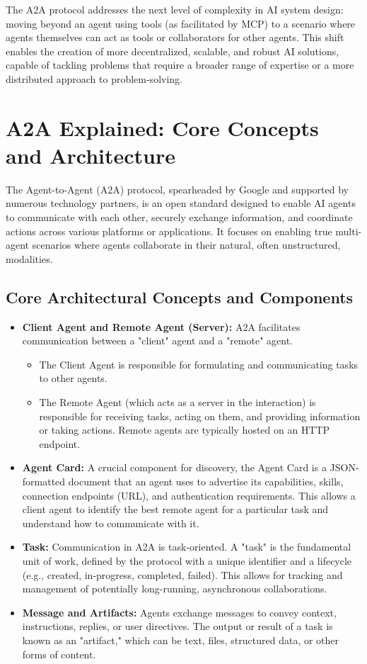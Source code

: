 The A2A protocol addresses the next level of complexity in AI system design: moving beyond an agent using tools (as facilitated by MCP) 
to a scenario where agents themselves can act as tools or collaborators for other agents. This shift enables the creation of more 
decentralized, scalable, and robust AI solutions, capable of tackling problems that require a broader range of expertise or 
a more distributed approach to problem-solving.

\section{A2A Explained: Core Concepts and Architecture}

The Agent-to-Agent (A2A) protocol, spearheaded by Google and supported by numerous technology partners, is an open standard designed 
to enable AI agents to communicate with each other, securely exchange information, and coordinate actions across various platforms or applications. 
It focuses on enabling true multi-agent scenarios where agents collaborate in their natural, often unstructured, modalities.

\subsection*{Core Architectural Concepts and Components}

\begin{itemize}
    \item \textbf{Client Agent and Remote Agent (Server):} A2A facilitates communication between a "client" agent and a "remote" agent.
    \begin{itemize}
        \item The Client Agent is responsible for formulating and communicating tasks to other agents.
        \item The Remote Agent (which acts as a server in the interaction) is responsible for receiving tasks, acting on them, and 
        providing information or taking actions. Remote agents are typically hosted on an HTTP endpoint.
    \end{itemize}
    \item \textbf{Agent Card:} A crucial component for discovery, the Agent Card is a JSON-formatted document that an agent uses to 
    advertise its capabilities, skills, connection endpoints (URL), and authentication requirements. This allows a client agent to 
    identify the best remote agent for a particular task and understand how to communicate with it.
    \item \textbf{Task:} Communication in A2A is task-oriented. A "task" is the fundamental unit of work, defined by the protocol 
    with a unique identifier and a lifecycle (e.g., created, in-progress, completed, failed). This allows for tracking and management 
    of potentially long-running, asynchronous collaborations.
    \item \textbf{Message and Artifacts:} Agents exchange messages to convey context, instructions, replies, or user directives. 
    The output or result of a task is known as an "artifact," which can be text, files, structured data, or other forms of content.
\end{itemize}

